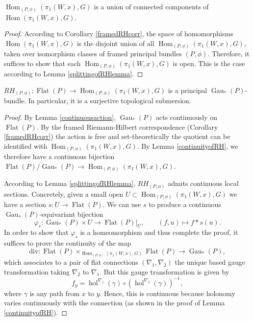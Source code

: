 \documentclass[10pt]{amsart}
\newcommand{\Hom}{\operatorname{Hom}}
\newcommand{\hol}{{\operatorname{hol}}}
\newcommand{\FlatObj}{{\operatorname{Flat}}}
\DeclareMathOperator{\Gau}{Gau}
\numberwithin{theoremalpha}{section}
\numberwithin{equation}{section}
\numberwithin{definition}{section}
\numberwithin{theorem}{section}
\numberwithin{proposition}{section}
\numberwithin{lemma}{section}
\numberwithin{example}{section}
\numberwithin{remark}{section}
\numberwithin{corollary}{section}
\numberwithin{question}{section}
\numberwithin{problem}{section}
\numberwithin{assumption}{section}
\theoremstyle{named}
\numberwithin{equation}{section}
\begin{document}
\begin{corollary} \label{connectivityofHoms}
$\Hom_{(P,\phi)}(\pi_{1}(W, x), G)$ is a union of connected components of $\Hom(\pi_{1}(W, x), G)$. 
\end{corollary}
\begin{proof}
According to Corollary \ref{framedRHcorr}, the space of homomorphisms $\Hom(\pi_{1}(W, x), G)$ is the disjoint union of all $\Hom_{(P,\phi)}(\pi_{1}(W, x), G)$, taken over isomorphism classes of framed principal bundles $(P, \phi)$. Therefore, it suffices to show that each $\Hom_{(P,\phi)}(\pi_{1}(W, x), G)$ is open. This is the case according to Lemma \ref{splittingofRHlemma}. 
\end{proof}

\begin{lemma} \label{principalbundlestatement}
$RH_{(P,\phi)} : \FlatObj(P) \to \Hom_{(P,\phi)}(\pi_{1}(W, x), G)$ is a principal $\Gau_{*}(P)$-bundle. In particular, it is a surjective topological submersion. 
\end{lemma}
\begin{proof}
By Lemma \ref{continuousaction}, $\Gau_{*}(P)$ acts continuously on $\FlatObj(P)$. By the framed Riemann-Hilbert correspondence (Corollary \ref{framedRHcorr}) the action is free and set-theoretically the quotient can be identified with $\Hom_{(P,\phi)}(\pi_{1}(W, x), G)$. By Lemma \ref{continuityofRH}, we therefore have a continuous bijection $\FlatObj(P)/\Gau_{*}(P) \to \Hom_{(P,\phi)}(\pi_{1}(W, x), G)$. 

According to Lemma \ref{splittingofRHlemma}, $RH_{(P,\phi)}$ admits continuous local sections. Concretely, given a small open $U \subset \Hom_{(P,\phi)}(\pi_{1}(W, x), G)$ we have a section $s: U \to \FlatObj(P)$. We can use $s$ to produce a continuous $\Gau_{*}(P)$-equivariant bijection 
\[ \varphi_{s} : \Gau_{*}(P) \times U \to \FlatObj(P)|_{U}, \qquad (f, u) \mapsto f \ast s(u). \]
In order to show that $\varphi_{s}$ is a homeomorphism and thus complete the proof, it suffices to prove the continuity of the map 
\[ \mathrm{div} : \FlatObj(P) \times_{\Hom_{(P,\phi)}(\pi_{1}(W, x), G)} \FlatObj(P) \to \Gau_{*}(P),\]
which associates to a pair of flat connections $(\nabla_{1}, \nabla_{2})$ the unique based gauge transformation taking $\nabla_{2}$ to $\nabla_{1}$. But this gauge transformation is given by 
\[  f_{y} = \hol^{\nabla_{1}}(\gamma) \circ (\hol^{\nabla_{2}}(\gamma))^{-1},  \]
where $\gamma$ is any path from $x$ to $y$. Hence, this is continuous because holonomy varies continuously with the connection (as shown in the proof of Lemma \ref{continuityofRH}).
\end{proof}
\end{document}
